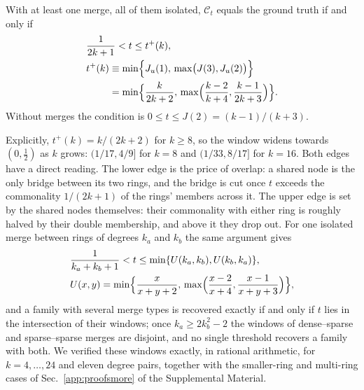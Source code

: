 \begin{theorem}
\label{thm:window}
With at least one merge, all of them isolated, $\mathcal C_t$ equals the ground truth
if and only if
\begin{equation}
\begin{aligned}
  &\frac{1}{2k+1}<t\le t^{+}(k),\\
  &t^{+}(k)\equiv\min\Bigl\{J_u(1),\,\max\bigl(J(3),J_u(2)\bigr)\Bigr\}\\
  &\phantom{t^{+}(k)}=\min\Bigl\{\frac{k}{2k+2},\,\max\Bigl(\frac{k-2}{k+4},\frac{k-1}{2k+3}\Bigr)\Bigr\}.
\end{aligned}
  \label{eq:window}
\end{equation}
Without merges the condition is $0\le t\le J(2)=(k-1)/(k+3)$.
\end{theorem}

Explicitly, $t^{+}(k)=k/(2k+2)$ for $k\ge8$, so the window widens towards $(0,\tfrac12)$
as $k$ grows: $(1/17,4/9]$ for $k=8$ and $(1/33,8/17]$ for $k=16$. Both edges have a
direct reading. The lower edge is the price of overlap: a shared node is the only bridge
between its two rings, and the bridge is cut once $t$ exceeds the commonality $1/(2k+1)$
of the rings' members across it. The upper edge is set by the shared nodes themselves:
their commonality with either ring is roughly halved by their double membership, and
above it they drop out. For one isolated merge between rings of degrees $k_a$ and $k_b$
the same argument gives
\begin{equation}
\begin{aligned}
  &\frac{1}{k_a+k_b+1}<t\le\min\{U(k_a,k_b),U(k_b,k_a)\},\\
  &U(x,y)=\min\Bigl\{\frac{x}{x+y+2},\,\max\Bigl(\frac{x-2}{x+4},\frac{x-1}{x+y+3}\Bigr)\Bigr\},
\end{aligned}
  \label{eq:windowab}
\end{equation}
and a family with several merge types is recovered exactly if and only if $t$ lies in the
intersection of their windows; once $k_a\ge2k_b^2-2$ the windows of dense--sparse and
sparse--sparse merges are disjoint, and no single threshold recovers a family with
both. We verified these windows exactly, in rational arithmetic, for $k=4,\dots,24$ and
eleven degree pairs, together with the smaller-ring and multi-ring cases of
Sec.~\ref{app:proofsmore} of the Supplemental Material.

